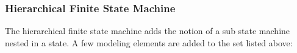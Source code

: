 

\subsubsection{Hierarchical Finite State Machine}

The hierarchical finite state machine adds the notion of a sub state machine nested in a state.
A few modeling elements are added to the set listed above:

